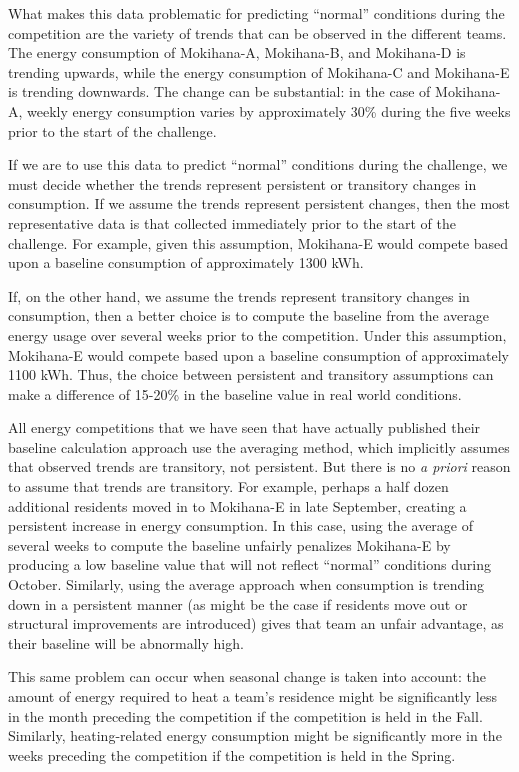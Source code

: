 \documentclass[jou]{apa} %
\begin{document}
What makes this data problematic for predicting ``normal'' conditions during the
competition are the variety of trends that can be observed in the different teams.  The
energy consumption of Mokihana-A, Mokihana-B, and Mokihana-D is trending upwards, while
the energy consumption of Mokihana-C and Mokihana-E is trending downwards.  The change can
be substantial: in the case of Mokihana-A, weekly energy consumption varies by
approximately 30\% during the five weeks prior to the start of the challenge.

If we are to use this data to predict ``normal'' conditions during the challenge, we must
decide whether the trends represent persistent or transitory changes in consumption.  If
we assume the trends represent persistent changes, then the most representative data is
that collected immediately prior to the start of the challenge.  For example, given this
assumption, Mokihana-E would compete based upon a baseline consumption of approximately 1300
kWh.

If, on the other hand, we assume the trends represent transitory changes in consumption,
then a better choice is to compute the baseline from the average energy usage over several
weeks prior to the competition.  Under this assumption, Mokihana-E would compete based
upon a baseline consumption of approximately 1100 kWh.  Thus, the choice between
persistent and transitory assumptions can make a difference of 15-20\% in the baseline value
in real world conditions.

All energy competitions that we have seen that have actually published their baseline
calculation approach use the averaging method, which implicitly assumes that observed
trends are transitory, not persistent.  But there is no {\em a priori} reason to assume
that trends are transitory.  For example, perhaps a half dozen additional residents moved
in to Mokihana-E in late September, creating a persistent increase in energy consumption.
In this case, using the average of several weeks to compute the baseline unfairly
penalizes Mokihana-E by producing a low baseline value that will not reflect ``normal''
conditions during October.  Similarly, using the average approach when consumption is
trending down in a persistent manner (as might be the case if residents move out or
structural improvements are introduced) gives that team an unfair advantage, as their
baseline will be abnormally high.

This same problem can occur when seasonal change is taken into account: the amount of
energy required to heat a team's residence might be significantly less in the month
preceding the competition if the competition is held in the Fall. Similarly,
heating-related energy consumption might be significantly more in the weeks preceding the
competition if the competition is held in the Spring.  
\end{document}
